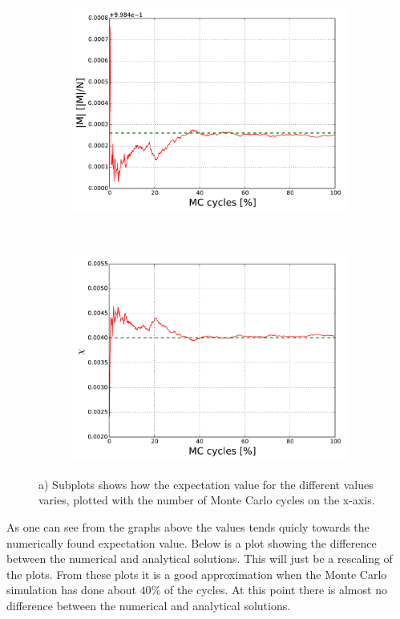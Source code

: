 \begin{figure}[H]
\begin{subfigure}{0.5\textwidth}
        \includegraphics[width=\linewidth]{result/bilder/2x2/mabs22}
        \caption{}
    \end{subfigure}%
    ~ 
    \begin{subfigure}{0.5\textwidth}
        \centering
        \includegraphics[width=\linewidth]{result/bilder/2x2/chi22}
        \caption{}
    \end{subfigure}
    \caption{a) Subplots shows how the expectation value for the different values varies, plotted with the number of Monte Carlo cycles on the x-axis.}
    \label{22results}
\end{figure}


As one can see from the graphs above the values tends quicly towards the numerically found expectation value. Below is a plot showing the difference between the numerical and analytical solutions. This will just be a rescaling of the plots. From these plots it is a good approximation when the Monte Carlo simulation has done about $40\%$ of the cycles. At this point there is almost no difference between the numerical and analytical solutions.


